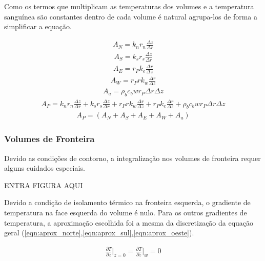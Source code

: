 \documentclass[
	12pt,				%
	openright,			%
	oneside,			%
	a4paper,			%
	english,			%
	french,				%
	spanish,			%
	brazil				%
	]{abntex2}
\begin{document}
Como os termos que multiplicam as temperaturas dos volumes e a temperatura sanguínea são constantes dentro de cada volume é natural agrupa-los de forma a simplificar a equação.

\begin{gather}
A_N=k_n r_n \frac{\Delta z}{\Delta r}
\end{gather}
\begin{gather}
A_S=k_s r_s \frac{\Delta z}{\Delta r}
\end{gather}
\begin{gather}
A_E=r_P k_e \frac{\Delta r}{\Delta z}
\end{gather}
\begin{gather}
A_W=r_P  r k_w \frac{\Delta r}{\Delta z}
\end{gather}
\begin{gather}
A_a=\rho_b c_b wr_P \Delta r\Delta z
\end{gather}
\begin{gather}
A_P=k_n r_n \frac{\Delta z}{\Delta r}+k_s r_s \frac{\Delta z}{\Delta r}+r_P  r k_w \frac{\Delta r}{\Delta z}+r_P k_e \frac{\Delta r}{\Delta z}+\rho_b c_b wr_P \Delta r\Delta z
\end{gather}
\begin{gather}
A_P=(A_N+A_S+A_E+A_W+A_a)
\end{gather}

\subsubsection{Volumes de Fronteira}
Devido as condições de contorno, a integralização nos volumes de fronteira requer alguns cuidados especiais. 
\par
ENTRA FIGURA AQUI
\par
Devido a condição de isolamento térmico na fronteira esquerda, o gradiente de temperatura na face esquerda do volume é nulo. Para os outros gradientes de temperatura, a aproximação escolhida foi a mesma da discretização da equação geral (\ref{eqn:aprox_norte},\ref{eqn:aprox_sul},\ref{eqn:aprox_oeste}).

\begin{gather}     
\frac{\partial T}{\partial z}\biggr\rvert_{z=0}=\frac{\partial T}{\partial z}\biggr\rvert_{w}=0
\end{gather}
\end{document}
